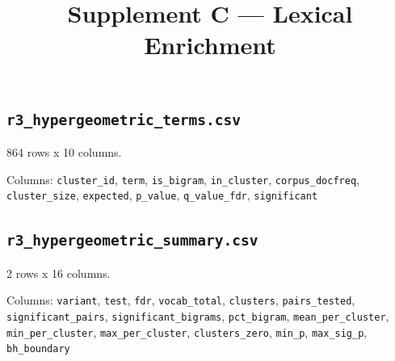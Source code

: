 \documentclass[10pt,a4paper]{article}
\title{\vspace{-14mm}\large Supplement C --- Lexical Enrichment}
\author{}\date{}
\begin{document}
\maketitle\thispagestyle{fancy}
\subsection*{\texttt{r3\_\allowbreak{}hypergeometric\_\allowbreak{}terms.csv}}
864 rows x 10 columns.

{\raggedright Columns: \texttt{cluster\_\allowbreak{}id}, \texttt{term}, \texttt{is\_\allowbreak{}bigram}, \texttt{in\_\allowbreak{}cluster}, \texttt{corpus\_\allowbreak{}docfreq}, \texttt{cluster\_\allowbreak{}size}, \texttt{expected}, \texttt{p\_\allowbreak{}value}, \texttt{q\_\allowbreak{}value\_\allowbreak{}fdr}, \texttt{significant}\par}

\subsection*{\texttt{r3\_\allowbreak{}hypergeometric\_\allowbreak{}summary.csv}}
2 rows x 16 columns.

{\raggedright Columns: \texttt{variant}, \texttt{test}, \texttt{fdr}, \texttt{vocab\_\allowbreak{}total}, \texttt{clusters}, \texttt{pairs\_\allowbreak{}tested}, \texttt{significant\_\allowbreak{}pairs}, \texttt{significant\_\allowbreak{}bigrams}, \texttt{pct\_\allowbreak{}bigram}, \texttt{mean\_\allowbreak{}per\_\allowbreak{}cluster}, \texttt{min\_\allowbreak{}per\_\allowbreak{}cluster}, \texttt{max\_\allowbreak{}per\_\allowbreak{}cluster}, \texttt{clusters\_\allowbreak{}zero}, \texttt{min\_\allowbreak{}p}, \texttt{max\_\allowbreak{}sig\_\allowbreak{}p}, \texttt{bh\_\allowbreak{}boundary}\par}
\end{document}

